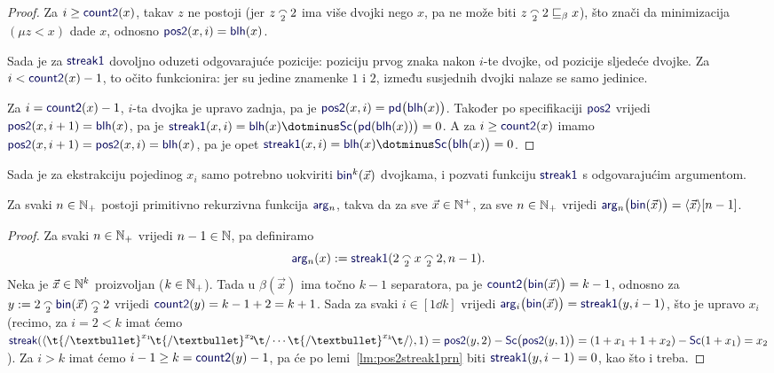 \begin{proof}
Za $i\ge\f{count2}(x)$, takav $z$ ne postoji (jer $z\conc22$ ima više dvojki nego $x$, pa ne može biti $z\conc22\sqsubseteq_\beta x$), što znači da minimizacija $(\mu z<x)$ dade $x$, odnosno $\f{pos2}(x,i)=\f{blh}(x)$.

Sada je za $\f{streak1}$ dovoljno oduzeti odgovarajuće pozicije: poziciju prvog znaka nakon $i$-te dvojke, od pozicije sljedeće dvojke. Za $i<\f{count2}(x)-1$, to očito funkcionira: jer su jedine znamenke $1$ i $2$, između susjednih dvojki nalaze se samo jedinice.

    Za $i=\f{count2}(x)-1$, $i$-ta dvojka je upravo zadnja, pa je $\f{pos2}(x,i)=\f{pd}\bigl(\f{blh}(x)\bigr)$. Također po specifikaciji $\f{pos2}$ vrijedi $\f{pos2}(x,i+1)=\f{blh}(x)$, pa je $\f{streak1}(x,i)=\f{blh}(x)\dotminus\f{Sc}\bigl(\f{pd}(\f{blh}(x))\bigr)=0$. A za $i\ge\f{count2}(x)$ imamo $\f{pos2}(x,i+1)=\f{pos2}(x,i)=\f{blh}(x)$, pa je opet $\f{streak1}(x,i)=\f{blh}(x)\dotminus\f{Sc}\bigl(\f{blh}(x)\bigr)=0$.
\end{proof}


Sada je za ekstrakciju pojedinog $x_i$ samo potrebno uokviriti $\f{bin}^k(\vec x)$ dvojkama, i pozvati funkciju $\f{streak1}$ s odgovarajućim argumentom.

\begin{propozicija}[{name=[primitivna rekurzivnost ekstrakcije argumenata]}]\label{pp:argnprn}
    Za svaki $n\in{\mathbb N}_+$ postoji primitivno rekurzivna funkcija $\f{arg}_n$, takva da za sve $\vec x\in{\mathbb N}^+$, za sve $n\in{\mathbb N}_+$ vrijedi $\f{arg}_n\bigl(\f{bin}(\vec x)\bigr)=\kr{\vec x}[n-1]$.
\end{propozicija}

\begin{proof}
Za svaki $n\in{\mathbb N}_+$ vrijedi $n-1\in{\mathbb N}$, pa definiramo
\begin{equation}
    \f{arg}_n(x):=\f{streak1}(2\conc2x\conc22,n-1)\text.
\end{equation}
Neka je $\vec x\in{\mathbb N}^k$ proizvoljan ($k\in{\mathbb N}_+$). Tada u $\beta(\vec x)$ ima točno $k-1$ separatora, pa je $\f{count2}\bigl(\f{bin}(\vec x)\bigr)=k-1$, odnosno za $y:=2\conc2\f{bin}(\vec x)\conc22$ vrijedi $\f{count2}(y)=k-1+2=k+1$. Sada za svaki $i\in[1\dd k]$ vrijedi $\f{arg}_i\bigl(\f{bin}(\vec x)\bigr)=\f{streak1}(y,i-1)$, što je upravo $x_i$ (recimo, za $i=2<k$ imat ćemo $\f{streak}(\kr{\t{/\textbullet}^{x_1}\!\t{/\textbullet}^{x_2}\!\t/\dotsm\t{/\textbullet}^{x_k}\!\t/},1)=\f{pos2}(y,2)-\f{Sc}\bigl(\f{pos2}(y,1)\bigr)=(1+x_1+1+x_2)-\f{Sc}(1+x_1)=x_2$).
Za $i>k$ imat ćemo $i-1\ge k=\f{count2}(y)-1$, pa će po lemi~\ref{lm:pos2streak1prn} biti $\f{streak1}(y,i-1)=0$, kao što i treba.
\end{proof}

